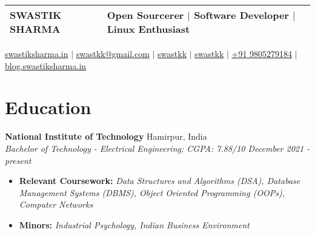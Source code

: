 \documentclass[legalpaper,10.5pt]{article}
\begin{document}
\pagestyle{empty} 


\begin{tabularx}{\linewidth}{@{} l X @{}}
\Huge {SWASTIK SHARMA} & \small{Open Sourcerer $|$ Software Developer $|$ Linux Enthusiast} \\[6pt]
\hline %
\end{tabularx}

\begin{flushleft}
\href{https://www.swastiksharma.in}{\raisebox{-0.05\height}{\faGlobe} swastiksharma.in} $|$ 
\href{mailto:swastkk@gmail.com}{\raisebox{-0.05\height}{\faEnvelope} swastkk@gmail.com} $|$ 
\href{https://github.com/swastkk}{\raisebox{-0.05\height}{\faGithub} swastkk} $|$ 
\href{https://linkedin.com/in/swastkk}{\raisebox{-0.05\height}{\faLinkedin} swastkk} $|$ 
\href{tel:+919805279184}{\raisebox{-0.05\height}{\faMobile} +91 9805279184} $|$ 
\href{https://blog.swastiksharma.in/}{\raisebox{-0.05\height}{\faPen} blog.swastiksharma.in}
\end{flushleft}


\section{Education}

 \textbf{National Institute of Technology}  \hfill {Hamirpur, India}  \\
    \textit{{Bachelor of Technology - Electrical Engineering; CGPA: 7.88/10} \hfill {December 2021 - present}}
    \begin{itemize}[leftmargin=*,label=$\diamond$]
        \item \small \textbf{Relevant Coursework:} \textit{Data Structures and Algorithms (DSA), Database Management Systems (DBMS), Object Oriented Programming (OOPs),  Computer Networks}
         \item \small \textbf{Minors:} \textit{Industrial Psychology, Indian Business Environment}
    \end{itemize}
\end{document}

